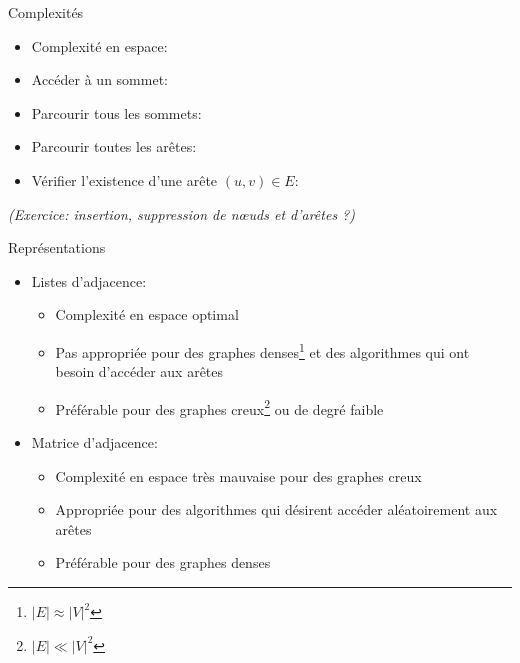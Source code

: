 \begin{frame}{Complexités}
\begin{itemize}
\item Complexité en espace: 
\item Accéder à un sommet: 
\item Parcourir tous les sommets: 
\item Parcourir toutes les arêtes: 
\item Vérifier l'existence d'une arête $(u,v)\in E$: 
\end{itemize}
{\it (Exercice: insertion, suppression de n\oe uds et d'arêtes ?)}
\end{frame}

\begin{frame}{Représentations}
\begin{itemize}
\item Listes d'adjacence:
\begin{itemize}
\item Complexité en espace optimal
\item Pas appropriée pour des graphes \alert{denses\footnote{$|E|\approx |V|^2$}} et des algorithmes qui ont besoin d'accéder aux arêtes
\item Préférable pour des graphes \alert{creux\footnote{$|E|\ll |V|^2$}} ou de degré faible
\end{itemize}

\bigskip

\item Matrice d'adjacence:
\begin{itemize}
\item Complexité en espace très mauvaise pour des graphes creux
\item Appropriée pour des algorithmes qui désirent accéder aléatoirement aux arêtes
\item Préférable pour des graphes \alert{denses}
\end{itemize}
\end{itemize}

\end{frame}


